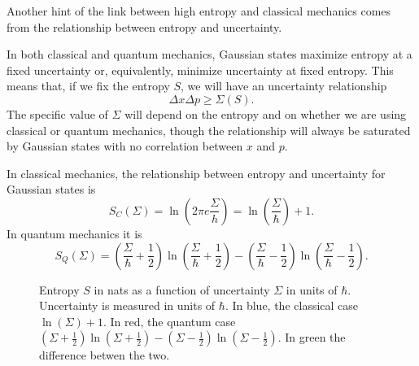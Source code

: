 \documentclass{article}
\begin{document}
Another hint of the link between high entropy and classical mechanics comes from the relationship between entropy and uncertainty.

In both classical and quantum mechanics, Gaussian states maximize entropy at a fixed uncertainty or, equivalently, minimize uncertainty at fixed entropy. This means that, if we fix the entropy $S$, we will have an uncertainty relationship
\begin{equation}
    \Delta x \Delta p \geq \Sigma(S).
\end{equation}
The specific value of $\Sigma$ will depend on the entropy and on whether we are using classical or quantum mechanics, though the relationship will always be saturated by Gaussian states with no correlation between $x$ and $p$.

In classical mechanics, the relationship between entropy and uncertainty for Gaussian states is\cite{Cover_Thomas_2006,Pathria_Beale_2022}
\begin{equation}
    S_C(\Sigma) = \ln \left(2 \pi e \frac{\Sigma}{h}\right) = \ln \left(\frac{\Sigma}{\hbar}\right) + 1.
\end{equation}
In quantum mechanics it is\cite{weedbrook2012gaussian}
\begin{equation}
S_Q(\Sigma) = \left( \frac{\Sigma}{\hbar} + \frac{1}{2} \right) \ln \left( \frac{\Sigma}{\hbar} + \frac{1}{2} \right) - \left( \frac{\Sigma}{\hbar} - \frac{1}{2} \right) \ln \left( \frac{\Sigma}{\hbar} - \frac{1}{2} \right).
\end{equation}

\begin{figure}
    \centering
{}
    \caption{Entropy $S$ in nats as a function of uncertainty $\Sigma$ in units of $\hbar$. Uncertainty is measured in units of $\hbar$. In blue, the classical case $\ln(\Sigma) + 1$. In red, the quantum case $\left( \Sigma + \frac{1}{2} \right) \ln \left( \Sigma + \frac{1}{2} \right) - \left( \Sigma - \frac{1}{2} \right) \ln \left( \Sigma - \frac{1}{2} \right)$. In green the difference betwen the two.}
    \label{fig:uncertainty}
\end{figure}
\end{document}
